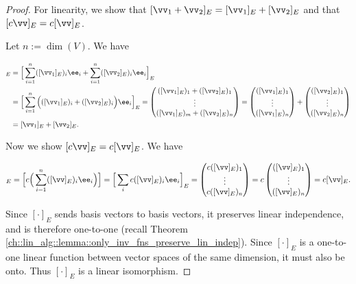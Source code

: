 \begin{proof}
    For linearity, we show that $[\vv_1 + \vv_2]_E = [\vv_1]_E + [\vv_2]_E$ and that $[c\vv]_E = c[\vv]_E$.
    
    Let $n := \dim(V)$. We have
        
    \begin{align*}
        [\vv_1 + \vv_2]_E
        &= \Big[\sum_{i = 1}^n ([\vv_1]_E)_i \ee_i + \sum_{i = 1}^n ([\vv_2]_E)_i \ee_i\Big]_E \\
        &= \Big[\sum_{i = 1}^n \Big(([\vv_1]_E)_i + ([\vv_2]_E)_i \Big) \ee_i \Big]_E
        = 
        \begin{pmatrix} ([\vv_1]_E)_1 + ([\vv_2]_E)_1 \\ \vdots \\ ([\vv_1]_E)_m + ([\vv_2]_E)_n \end{pmatrix}
        =
        \begin{pmatrix} ([\vv_1]_E)_1 \\ \vdots \\ ([\vv_1]_E)_n \end{pmatrix}
        +
        \begin{pmatrix} ([\vv_2]_E)_1 \\ \vdots \\ ([\vv_2]_E)_n \end{pmatrix} \\
        &= [\vv_1]_E + [\vv_2]_E.
    \end{align*}
        
    Now we show $[c \vv]_E = c [\vv]_E$. We have

     \begin{align*}
        [c\vv]_E = \Big[ c \Big( \sum_{i = 1 }^n ([\vv]_E)_i \ee_i \Big) \Big] = \Big[\sum_i c([\vv]_E)_i \ee_i\Big]_E = \begin{pmatrix} c([\vv]_E)_1 \\ \vdots \\ c([\vv]_E)_n \end{pmatrix}
        = c \begin{pmatrix} ([\vv]_E)_1 \\ \vdots \\ ([\vv]_E)_n \end{pmatrix}
        = c[\vv]_E.
    \end{align*}
    
    Since $[\cdot]_E$ sends basis vectors to basis vectors, it preserves linear independence, and is therefore one-to-one (recall Theorem \ref{ch::lin_alg::lemma::only_inv_fns_preserve_lin_indep}). Since $[\cdot]_E$ is a one-to-one linear function between vector spaces of the same dimension, it must also be onto. Thus $[\cdot]_E$ is a linear isomorphism.

\end{proof}

